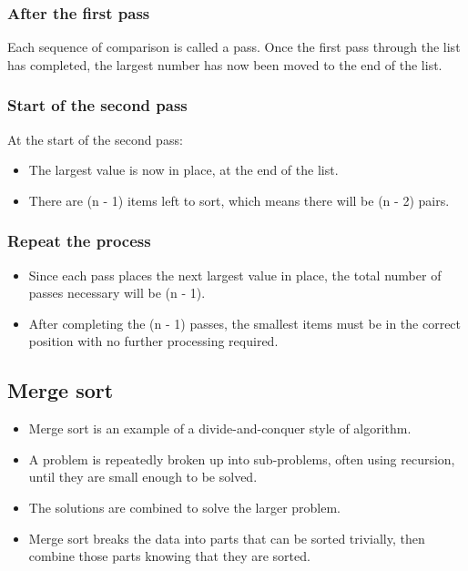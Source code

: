 \documentclass[11pt]{article}
\begin{document}
\subsubsection{After the first pass}
\label{sec:orga790e79}
Each sequence of comparison is called a pass. Once the first pass through the list has completed, the largest number has now been moved to the end of the list.

\subsubsection{Start of the second pass}
\label{sec:orgd8afbb2}
At the start of the second pass:
\begin{itemize}
\item The largest value is now in place, at the end of the list.
\item There are (n - 1) items left to sort, which means there will be (n - 2) pairs.
\end{itemize}

\subsubsection{Repeat the process}
\label{sec:org7179a25}
\begin{itemize}
\item Since each pass places the next largest value in place, the total number of passes necessary will be (n - 1).
\item After completing the (n - 1) passes, the smallest items must be in the correct position with no further processing required.
\end{itemize}

 \newpage

\subsection{Merge sort}
\label{sec:orgc13dc4b}
\begin{itemize}
\item Merge sort is an example of a divide-and-conquer style of algorithm.
\item A problem is repeatedly broken up into sub-problems, often using recursion, until they are small enough to be solved.
\item The solutions are combined to solve the larger problem.
\item Merge sort breaks the data into parts that can be sorted trivially, then combine those parts knowing that they are sorted.
\end{itemize}
\end{document}
